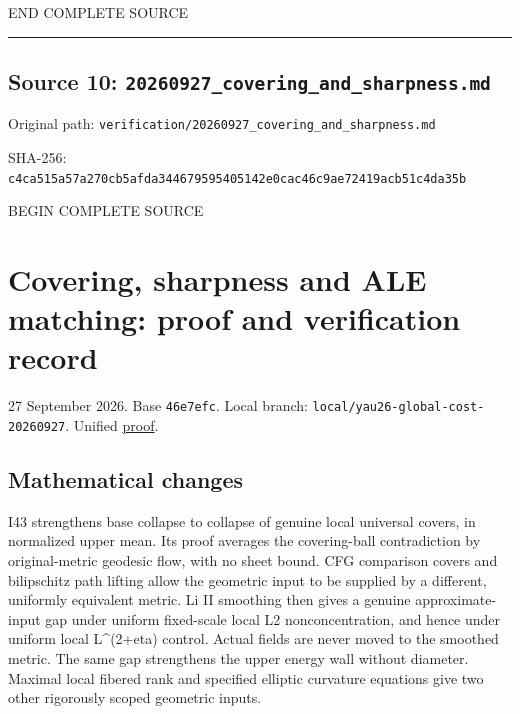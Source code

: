 \documentclass[
  10pt,
]{article}
\begin{document}
END COMPLETE SOURCE

\begin{center}\rule{0.5\linewidth}{0.5pt}\end{center}

\hypertarget{source-10-20260927_covering_and_sharpness.md}{%
\subsection{Source 10:
\nolinkurl{20260927_covering_and_sharpness.md}}\label{source-10-20260927_covering_and_sharpness.md}}

Original path:
\nolinkurl{verification/20260927_covering_and_sharpness.md}

SHA-256:
\nolinkurl{c4ca515a57a270cb5afda344679595405142e0cac46c9ae72419acb51c4da35b}

BEGIN COMPLETE SOURCE

\hypertarget{covering-sharpness-and-ale-matching-proof-and-verification-record}{%
\section{Covering, sharpness and ALE matching: proof and verification
record}\label{covering-sharpness-and-ale-matching-proof-and-verification-record}}

27 September 2026. Base \texttt{46e7efc}. Local branch:
\nolinkurl{local/yau26-global-cost-20260927}. Unified
\href{../continuation/20260927_covering_geometry_and_sharp_subfamilies.md}{proof}.

\hypertarget{mathematical-changes-2}{%
\subsection{Mathematical changes}\label{mathematical-changes-2}}

I43 strengthens base collapse to collapse of genuine local universal
covers, in normalized upper mean. Its proof averages the covering-ball
contradiction by original-metric geodesic flow, with no sheet bound. CFG
comparison covers and bilipschitz path lifting allow the geometric input
to be supplied by a different, uniformly equivalent metric. Li II
smoothing then gives a genuine approximate-input gap under uniform
fixed-scale local L2 nonconcentration, and hence under uniform local
L\^{}(2+eta) control. Actual fields are never moved to the smoothed
metric. The same gap strengthens the upper energy wall without diameter.
Maximal local fibered rank and specified elliptic curvature equations
give two other rigorously scoped geometric inputs.
\end{document}
